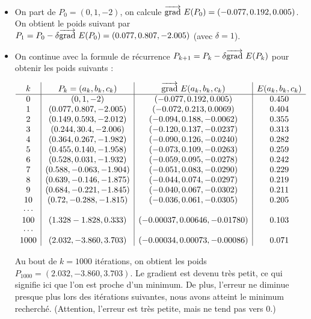 {\begin{exemple}{}{}
\begin{itemize}
		\item On part de $P_0 = (0,1,-2)$, on calcule $\overrightarrow{\textup{grad}}\  E(P_0) = (-0.077, 0.192, 0.005)$. On obtient le poids suivant par $P_1 = P_0 - \delta \overrightarrow{\textup{grad}}\  E(P_0) = (0.077,    0.807,    -2.005)$ (avec $\delta = 1$).   
		
		\item On continue avec la formule de récurrence $P_{k+1} = P_k - \delta \overrightarrow{\textup{grad}}\  E(P_k)$ pour obtenir les poids suivants :
		
		$$
		\begin{array}{c|c|c|c}
			k & P_k = (a_k,b_k,c_k) & \overrightarrow{\textup{grad}}\  E(a_k,b_k,c_k) & E(a_k,b_k,c_k) \\ \hline  
			0 & (0, 1, -2)                   & (-0.077, 0.192, 0.005)       & 0.450 \\
			1 & (0.077,    0.807,    -2.005) & (-0.072,   0.213,   0.0069 ) & 0.404 \\
			2 & (0.149,    0.593,    -2.012) & (-0.094,   0.188,  -0.0062 ) & 0.355 \\
			3 & (0.244,    3 0.4,    -2.006) & (-0.120,   0.137,  -0.0237 ) & 0.313 \\
			4 & (0.364,    0.267,    -1.982) & (-0.090,   0.126,  -0.0240 ) & 0.282 \\
			5 & (0.455,    0.140,    -1.958) & (-0.073,   0.109,  -0.0263 ) & 0.259 \\
			6 & (0.528,    0.031,    -1.932) & (-0.059,   0.095,  -0.0278 ) & 0.242 \\
			7 & (0.588,   -0.063,    -1.904) & (-0.051,   0.083,  -0.0290 ) & 0.229 \\
			8 & (0.639,   -0.146,    -1.875) & (-0.044,   0.074,  -0.0297 ) & 0.219 \\
			9 & (0.684,   -0.221,    -1.845) & (-0.040,   0.067,  -0.0302 ) & 0.211 \\
			10 & (0.72,   -0.288,    -1.815) & (-0.036,   0.061,  -0.0305 ) & 0.205 \\
			\cdots & & & \\
			100 & (1.328 -1.828, 0.333) & (-0.00037, 0.00646, -0.01780) & 0.103 \\
			\cdots & & & \\
			1000 & (2.032, -3.860, 3.703) & (-0.00034, 0.00073, -0.00086) & 0.071 \\  
		\end{array}
		$$  
		
		Au bout de $k=1000$ itérations, on obtient les poids  $P_{1000} =(2.032, -3.860, 3.703)$. Le gradient est devenu très petit, ce qui signifie ici que l'on est proche d'un minimum. De plus, l'erreur ne diminue presque plus lors des itérations suivantes, nous avons atteint le minimum recherché. (Attention, l'erreur est très petite, mais ne tend pas vers $0$.)
		

\end{itemize}
\end{exemple}}
